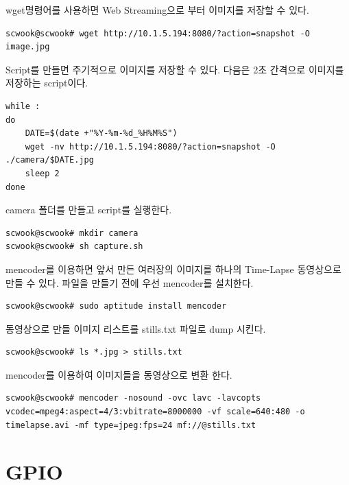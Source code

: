 \documentclass[11pt
  , a4paper
  , article
  , oneside
]{memoir}
\begin{document}
wget명령어를 사용하면 Web Streaming으로 부터 이미지를 저장할 수 있다.
\begin{lstlisting}[style=termstyle]
scwook@scwook# wget http://10.1.5.194:8080/?action=snapshot -O image.jpg
\end{lstlisting}
Script를 만들면 주기적으로 이미지를 저장할 수 있다. 다음은 2초 간격으로 이미지를 저장하는 script이다.
\begin{lstlisting}[style=termstyle]
while :
do
	DATE=$(date +"%Y-%m-%d_%H%M%S")
	wget -nv http://10.1.5.194:8080/?action=snapshot -O ./camera/$DATE.jpg
	sleep 2
done
\end{lstlisting}
camera 폴더를 만들고 script를 실행한다.
\begin{lstlisting}[style=termstyle]
scwook@scwook# mkdir camera
scwook@scwook# sh capture.sh
\end{lstlisting}
mencoder를 이용하면 앞서 만든 여러장의 이미지를 하나의 Time-Lapse 동영상으로 만들 수 있다.
파일을 만들기 전에 우선 mencoder를 설치한다.
\begin{lstlisting}[style=termstyle]
scwook@scwook# sudo aptitude install mencoder
\end{lstlisting}
동영상으로 만들 이미지 리스트를 stills.txt 파일로 dump 시킨다.
\begin{lstlisting}[style=termstyle]
scwook@scwook# ls *.jpg > stills.txt
\end{lstlisting}
mencoder를 이용하여 이미지들을 동영상으로 변환 한다.
\begin{lstlisting}[style=termstyle]
scwook@scwook# mencoder -nosound -ovc lavc -lavcopts vcodec=mpeg4:aspect=4/3:vbitrate=8000000 -vf scale=640:480 -o timelapse.avi -mf type=jpeg:fps=24 mf://@stills.txt
\end{lstlisting}
\section{GPIO}\label{sec:gpioApp}
\end{document}
